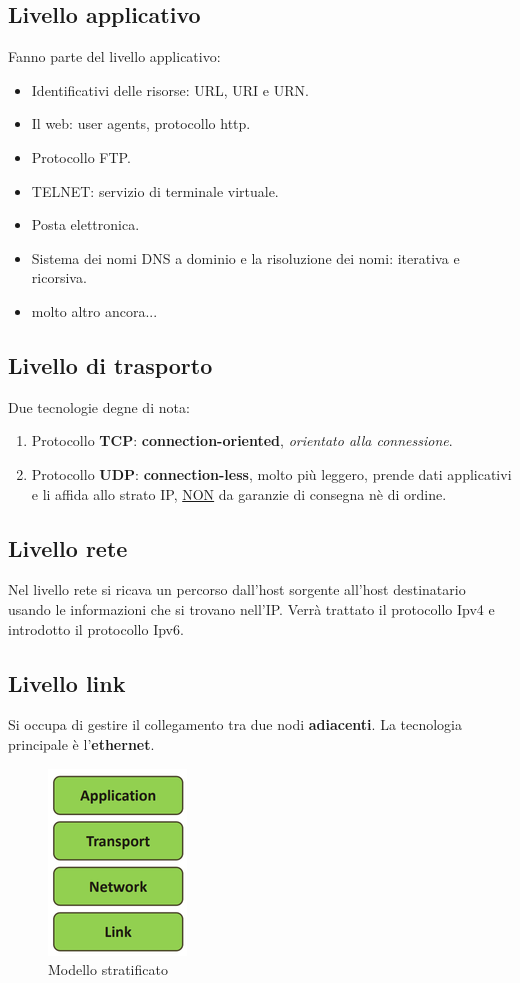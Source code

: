 \documentclass[11pt,a4paper]{article}
\theoremstyle{definition}
\begin{document}
\pagebreak

\subsection{Livello applicativo}
Fanno parte del livello applicativo:
\begin{itemize}
	\item Identificativi delle risorse: URL, URI e URN.
	\item Il web: user agents, protocollo http.
	\item Protocollo FTP.
	\item TELNET: servizio di terminale virtuale.
	\item Posta elettronica.
	\item Sistema dei nomi DNS a dominio e la risoluzione dei nomi: iterativa e ricorsiva.
	\item molto altro ancora...
\end{itemize}

\subsection{Livello di trasporto}
Due tecnologie degne di nota:
\begin{enumerate}
	\item Protocollo \textbf{TCP}: \textbf{connection-oriented}, \textit{orientato alla connessione}.
	\item Protocollo \textbf{UDP}: \textbf{connection-less}, molto più leggero, prende dati applicativi e li affida allo strato IP, \underline{NON} da garanzie di consegna nè di ordine.
\end{enumerate}

\subsection{Livello rete}
Nel livello rete si ricava un percorso dall'host sorgente all'host destinatario usando le informazioni che si trovano nell'IP.\newline
Verrà trattato il protocollo Ipv4 e introdotto il protocollo Ipv6.

\subsection{Livello link}
Si occupa di gestire il collegamento tra due nodi \textbf{adiacenti}.
La tecnologia principale è l'\textbf{ethernet}.
\begin{figure}[!h]
	\includegraphics[scale=0.47]{Immagini/Modelli_Strat.png}
	\centering
	\caption{Modello stratificato}
\end{figure}
\pagebreak
\end{document}
